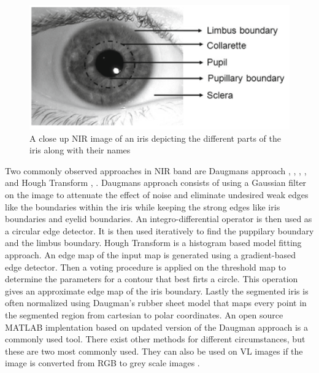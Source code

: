 \begin{figure}[htb]
\centering
\includegraphics[width=\textwidth]{figures/iris_naming.png} 
\caption{A close up NIR image of an iris depicting the different parts of the iris along with their names \citep{Bowyer2016b}}
\label{fig:iris_naming}
\end{figure}

Two commonly observed approaches in NIR band are Daugmans approach \citep{Daugman1993} , \citep{Saha2017a}, \citep{Rattani2017}, \citep{Khan2017a}, and Hough Transform \citep{Luhadiya2017a}, \citep{Uka2017a}. Daugmans approach consists of using a Gaussian filter on the image to attenuate the effect of noise and eliminate undesired weak edges like the boundaries within the iris while keeping the strong edges like iris boundaries and eyelid boundaries. An integro-differential operator is then used as a circular edge detector. It is then used iteratively to find the puppilary boundary and the limbus boundary. Hough Transform  is a histogram based model fitting approach. An edge map of the input map is generated using a gradient-based edge detector. Then a voting procedure is applied on the threshold map to determine the parameters for a contour that best firts a circle. This  operation gives an approximate edge map of the iris boundary. Lastly the segmented iris is often normalized  using  Daugman's rubber sheet model that maps every point in the segmented region from cartesian to polar coordinates. An open source MATLAB implentation based on updated version of the Daugman approach is a commonly used tool. There exist other methods for different circumstances, but these are two most commonly used. They can also be used on VL images if the image is converted from RGB to grey scale images \cite{Bowyer2016b} . 

